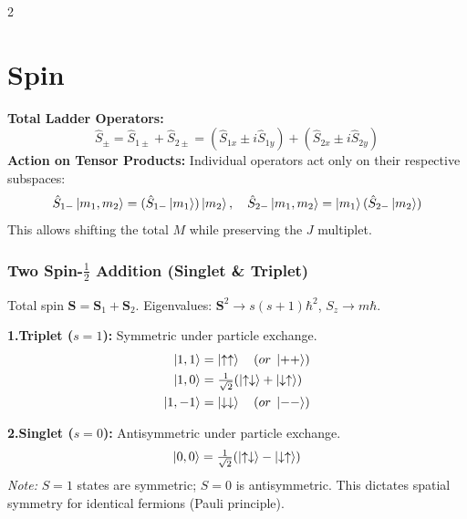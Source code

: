 \documentclass[9pt,a4paper]{article} %
\begin{document}
\begin{multicols}{2}
\begin{center}
{\renewcommand{\arraystretch}{1.2}
}
\end{center}
\section{Spin}
\textbf{Total Ladder Operators:}
\[
\hat{S}_{\pm} = \hat{S}_{1\pm} + \hat{S}_{2\pm} = (\hat{S}_{1x} \pm i\hat{S}_{1y}) + (\hat{S}_{2x} \pm i\hat{S}_{2y})
\]
\textbf{Action on Tensor Products:}
Individual operators act only on their respective subspaces:
\[
\hat{S}_{1-}\ket{m_1, m_2} = (\hat{S}_{1-}\ket{m_1})\ket{m_2}, \quad \hat{S}_{2-}\ket{m_1, m_2} = \ket{m_1}(\hat{S}_{2-}\ket{m_2})
\]
This allows shifting the total $M$ while preserving the $J$ multiplet.
\subsubsection{Two Spin-$\frac{1}{2}$ Addition (Singlet \& Triplet)}
Total spin $\mathbf{S}=\mathbf{S}_1+\mathbf{S}_2$. Eigenvalues: $\mathbf{S}^2\to s(s+1)\hbar^2$, $S_z\to m\hbar$.

\textbf{1.\;Triplet ($s=1$):} Symmetric under particle exchange.
\begin{align*}
\ket{1,1} &= \ket{\uparrow\uparrow} \quad (or\; \ket{++}) \\
\ket{1,0} &= \tfrac{1}{\sqrt{2}}(\ket{\uparrow\downarrow}+\ket{\downarrow\uparrow}) \\
\ket{1,-1} &= \ket{\downarrow\downarrow} \quad (or\; \ket{--})
\end{align*}

\textbf{2.\;Singlet ($s=0$):} Antisymmetric under particle exchange.
\[
\ket{0,0} = \tfrac{1}{\sqrt{2}}(\ket{\uparrow\downarrow}-\ket{\downarrow\uparrow})
\]
\textit{Note:} $S=1$ states are symmetric; $S=0$ is antisymmetric. This dictates spatial symmetry for identical fermions (Pauli principle).

\end{multicols}
\end{document}
